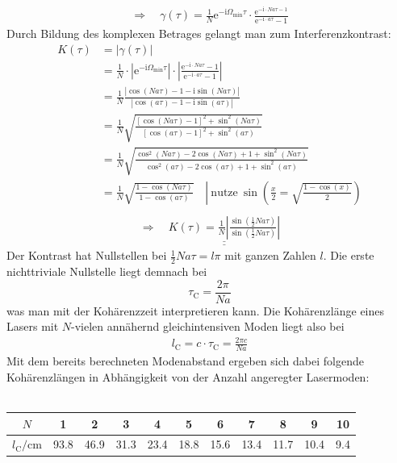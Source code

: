 \documentclass[german,  %
parskip=full,  %
]{scrartcl}
\begin{document}
\begin{align}
\Longrightarrow\quad \gamma(\tau) = \frac{1}{N} \mathrm{e}^{-\mathrm{i}\Omega_{\mathrm{min}}\tau}\cdot\frac{\mathrm{e}^{-\mathrm{i}\cdot Na\tau - 1}}{\mathrm{e}^{-\mathrm{i}\cdot a\tau} - 1}
\end{align}
Durch Bildung des komplexen Betrages gelangt man zum Interferenzkontrast:
\begin{align*}
K(\tau) &= |\gamma(\tau)| \\
&= \frac{1}{N}\cdot\left|\mathrm{e}^{-\mathrm{i}\Omega_{\mathrm{min}}\tau}\right|\cdot\left|\frac{\mathrm{e}^{-\mathrm{i}\cdot Na\tau } - 1}{\mathrm{e}^{-\mathrm{i}\cdot a\tau} - 1}\right| \\
&= \frac{1}{N} \frac{|\cos (Na\tau) - 1 - \mathrm{i}\sin(Na\tau)|}{|\cos (a\tau) - 1 - \mathrm{i}\sin(a\tau)|} \\
&= \frac{1}{N} \sqrt{\frac{\left[\cos (Na\tau) - 1\right]^2 + \sin^2(Na\tau)}{\left[\cos (a\tau) - 1\right]^2 + \sin^2(a\tau)}} \\ 
&= \frac{1}{N} \sqrt{\frac{\cos^2 (Na\tau) - 2\cos(Na\tau) + 1 + \sin^2(Na\tau)}{\cos^2 (a\tau) - 2\cos(a\tau) + 1 + \sin^2(a\tau)}} \\
&= \frac{1}{N} \sqrt{\frac{1- \cos (Na\tau) }{1 -\cos (a\tau) }} \quad\left| \ \text{nutze} \ \sin\left(\frac{x}{2} = \sqrt{\frac{1-\cos(x)}{2}}\right)\right. \\
\end{align*}
\begin{align}
\Longrightarrow\quad \underline{\underline{K(\tau) = \frac{1}{N} \left|\frac{\sin\left(\frac{1}{2}Na\tau\right) }{\sin\left(\frac{1}{2}Na\tau\right) }\right| }}
\end{align}
Der Kontrast hat Nullstellen bei \(\frac{1}{2}Na\tau = l\pi\) mit ganzen Zahlen \(l\). Die erste nichttriviale Nullstelle liegt demnach bei
\[\tau_{\mathrm{C}} = \frac{2\pi}{Na}\]
was man mit der Kohärenzzeit interpretieren kann. Die Kohärenzlänge eines Lasers mit \(N\)-vielen annähernd gleichintensiven Moden liegt also bei
\begin{align}
l_{\mathrm{C}} = c\cdot\tau_{\mathrm{C}} = \frac{2\pi c}{Na} 
\end{align}
Mit dem bereits berechneten Modenabstand ergeben sich dabei folgende Kohärenzlängen in Abhängigkeit von der Anzahl angeregter Lasermoden: \\\\
\begin{table}[h!] \centering
\begin{tabular}{|c|c|c|c|c|c|c|c|c|c|c|}
\hline
\(N\) & 1 & 2 & 3 & 4 & 5 & 6 & 7 & 8 & 9 & 10\\\hline
\(l_{\mathrm{C}} \mathrm{/} \mathrm{cm}\) & 93.8 & 46.9 & 31.3 & 23.4 & 18.8 & 15.6 & 13.4 & 11.7 & 10.4 & 9.4 \\\hline
\end{tabular}
\end{table} \\\\
\end{document}
